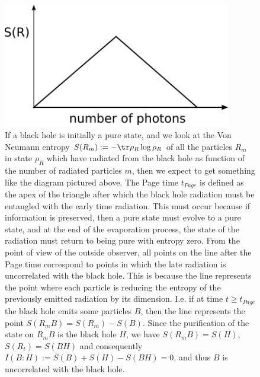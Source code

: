 \documentclass[12pt,a4paper]{article}
\begin{document}
\begin{figure}
\includegraphics[width=10cm]{page3.pdf}
	\caption{	
	If a black hole is initially a pure state, and we look at the Von Neumann entropy $S(R_m):=-\tr\rho_R\log\rho_R$ of all the particles $R_m$ in state $\rho_R$ which have radiated from the black hole as function of the number of radiated particles $m$, then we expect to get something like the diagram pictured above\cite{page-unitary-evap}.  The Page time $t_{Page}$ is defined as the apex of the triangle after which the black hole radiation must be entangled with the early time radiation. This must occur because if information is preserved, then a pure state must evolve to a pure state, and at the end of the evaporation process, the state of the radiation must return to being pure with entropy zero. From the point of view of the outside observer, all points on the line after the Page time correspond to points in which the late radiation is uncorrelated with the black hole.  This is because the line represents the point where each particle is reducing the entropy of the previously emitted radiation by its dimension. I.e. if at time $t\geq t_{Page}$ the black hole emits some particles $B$, then the line represents the point $S(R_mB)=S(R_m)-S(B)$. Since the purification of the state on $R_mB$ is the black hole $H$, we have $S(R_mB)=S(H)$, $S(R_t)=S(BH)$ and consequently $I(B:H):=S(B)+S(H)-S(BH)=0$, and thus $B$ is uncorrelated with the black hole.  
	}
\label{fig:page}
\end{figure}
\end{document}
